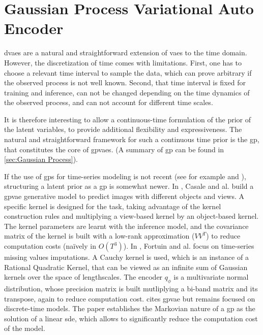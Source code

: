 \chapter{Gaussian Process Variational Auto Encoder}\label{sec:Gaussian Process VAE}

\glspl{dvae} are a natural and straightforward extension of \glspl{vae} to the time domain. However, the discretization of time comes with limitations. First, one has to choose a relevant time interval to sample the data, which can prove arbitrary if the observed process is not well known. Second, that time interval is fixed for training and inference, can not be changed depending on the time dynamics of the observed process, and can not account for different time scales.

It is therefore interesting to allow a continuous-time formulation of the prior of the latent variables, to provide additional flexibility and expressiveness. The natural and straightforward framework for such a continuous time prior is the \gls{gp}, that constitutes the core of \glspl{gpvae}.
(A summary of \gls{gp} can be found in \ref{sec:Gaussian Process}).

If the use of \glspl{gp} for time-series modeling is not recent (see for example \cite{rasmussen_gaussian_2008} and \cite{roberts_gaussian_2013}), structuring a latent prior as a \gls{gp} is somewhat newer. In \cite{casale_gaussian_2018}, Casale and al. build a \gls{gpvae} generative model to predict images with different objects and views. A specific kernel is designed for the task, taking advantage of the kernel construction rules and multiplying a view-based kernel by an object-based kernel. The kernel parameters are learnt with the inference model, and the covariance matrix of the kernel is built with a low-rank approximation ($VV^T$) to reduce computation costs (naïvely in $O(T^3)$). In \cite{fortuin_gp-vae:_2020}, Fortuin and al. focus on time-series missing values imputations. A Cauchy kernel is used, which is an instance of a Rational Quadratic Kernel, that can be viewed as an infinite sum of Gaussian kernels over the space of lengthscales. The encoder $q_\phi$ is a multivariate normal distribution, whose precision matrix is built mutliplying a bi-band matrix and its transpose, again to reduce computation cost. \cite{girin_dynamical_2022} cites \gls{gpvae} but remains focused on discrete-time models. The paper \cite{zhu_markovian_2023} establishes the Markovian nature of a \gls{gp} as the solution of a linear \gls{sde}, which allows to significantly reduce the computation cost of the model. 


